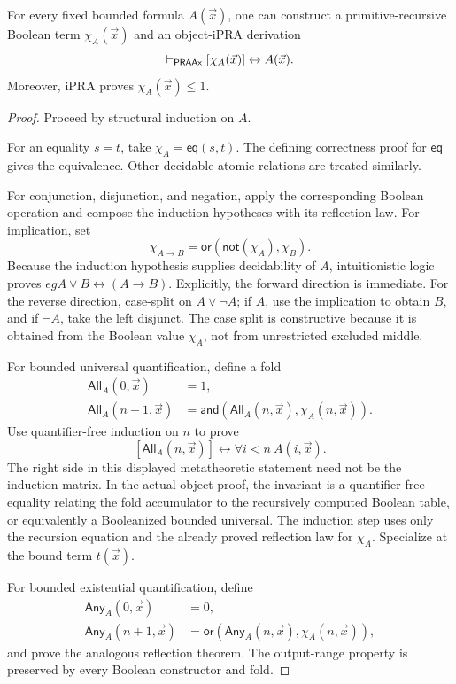 \begin{theorem}
\label{thm:booleanization}
For every fixed bounded formula \(A(\vec{x})\), one can construct a primitive-recursive Boolean term \(\chi_A(\vec{x})\) and an object-iPRA derivation
\[
  \vdash_{\mathsf{PRAAx}} [\chi_A(\vec{x})]\leftrightarrow A(\vec{x}).
\]
Moreover, iPRA proves \(\chi_A(\vec{x})\le 1\).
\end{theorem}

\begin{proof}
Proceed by structural induction on \(A\).

For an equality \(s=t\), take \(\chi_A=\mathsf{eq}(s,t)\).  The defining correctness proof for \(\mathsf{eq}\) gives the equivalence.  Other decidable atomic relations are treated similarly.

For conjunction, disjunction, and negation, apply the corresponding Boolean operation and compose the induction hypotheses with its reflection law.  For implication, set
\[
  \chi_{A\to B}=\mathsf{or}(\mathsf{not}(\chi_A),\chi_B).
\]
Because the induction hypothesis supplies decidability of \(A\), intuitionistic logic proves
\(
eg A\vee B\leftrightarrow(A\to B)\).  Explicitly, the forward direction is immediate.  For the reverse direction, case-split on \(A\vee\neg A\); if \(A\), use the implication to obtain \(B\), and if \(\neg A\), take the left disjunct.  The case split is constructive because it is obtained from the Boolean value \(\chi_A\), not from unrestricted excluded middle.

For bounded universal quantification, define a fold
\begin{align*}
 \mathsf{All}_A(0,\vec{x}) &=1,\\
 \mathsf{All}_A(n+1,\vec{x})
  &=\mathsf{and}(\mathsf{All}_A(n,\vec{x}),\chi_A(n,\vec{x})).
\end{align*}
Use quantifier-free induction on \(n\) to prove
\[
 [\mathsf{All}_A(n,\vec{x})]
 \leftrightarrow \forall i<n\ A(i,\vec{x}).
\]
The right side in this displayed metatheoretic statement need not be the induction matrix.  In the actual object proof, the invariant is a quantifier-free equality relating the fold accumulator to the recursively computed Boolean table, or equivalently a Booleanized bounded universal.  The induction step uses only the recursion equation and the already proved reflection law for \(\chi_A\).  Specialize at the bound term \(t(\vec{x})\).

For bounded existential quantification, define
\begin{align*}
 \mathsf{Any}_A(0,\vec{x}) &=0,\\
 \mathsf{Any}_A(n+1,\vec{x})
  &=\mathsf{or}(\mathsf{Any}_A(n,\vec{x}),\chi_A(n,\vec{x})),
\end{align*}
and prove the analogous reflection theorem.  The output-range property is preserved by every Boolean constructor and fold.
\end{proof}

